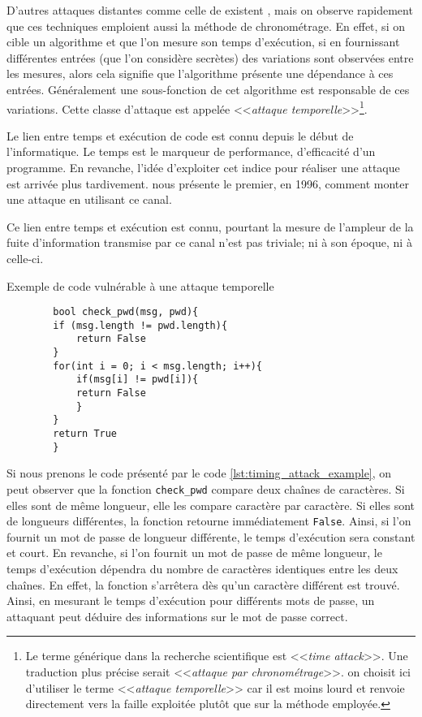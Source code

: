 D'autres attaques distantes comme celle de \citeauthor{LLC_attack} existent \cite{cryptoeprint:2016/224,Moghimi_2017,vanbulck2018nemesis}, mais on observe rapidement que ces techniques emploient aussi la méthode de chronométrage. En effet, si on cible un algorithme et que l'on mesure son temps d'exécution, si en fournissant différentes entrées (que l'on considère secrètes) des variations sont observées entre les mesures, alors cela signifie que l'algorithme présente une dépendance à ces entrées. Généralement une sous-fonction de cet algorithme est responsable de ces variations. Cette classe d'attaque est appelée <<\textit{attaque temporelle}>>\footnote{Le terme générique dans la recherche scientifique est <<\textit{time attack}>>. Une traduction plus précise serait <<\textit{attaque par chronométrage}>>. on choisit ici d'utiliser le terme <<\textit{attaque temporelle}>> car il est moins lourd et renvoie directement vers la faille exploitée plutôt que sur la méthode employée.}.\medbreak

Le lien entre temps et exécution de code est connu depuis le début de l'informatique. Le temps est le marqueur de performance, d'efficacité d'un programme. En revanche, l'idée d'exploiter cet indice pour réaliser une attaque est arrivée plus tardivement. \citeauthor{crypto-1996-1469} nous présente le premier, en 1996, comment monter une attaque en utilisant ce canal.\medbreak

Ce lien entre temps et exécution est connu, pourtant la mesure de l'ampleur de la fuite d'information transmise par ce canal n'est pas triviale; ni à son époque, ni à celle-ci.

\begin{listing}[!ht]
    \caption{Exemple de code vulnérable à une attaque temporelle}
    \label{lst:timing_attack_example}
    \begin{verbatim}
        bool check_pwd(msg, pwd){
        if (msg.length != pwd.length){
            return False
        }
        for(int i = 0; i < msg.length; i++){
            if(msg[i] != pwd[i]){
            return False
            }
        }
        return True
        }
    \end{verbatim}
\end{listing}
                
Si nous prenons le code présenté par le code \ref{lst:timing_attack_example}, on peut observer que la fonction \texttt{check\_pwd} compare deux chaînes de caractères. Si elles sont de même longueur, elle les compare caractère par caractère. Si elles sont de longueurs différentes, la fonction retourne immédiatement \texttt{False}. Ainsi, si l'on fournit un mot de passe de longueur différente, le temps d'exécution sera constant et court. En revanche, si l'on fournit un mot de passe de même longueur, le temps d'exécution dépendra du nombre de caractères identiques entre les deux chaînes. En effet, la fonction s'arrêtera dès qu'un caractère différent est trouvé. Ainsi, en mesurant le temps d'exécution pour différents mots de passe, un attaquant peut déduire des informations sur le mot de passe correct.\medbreak

